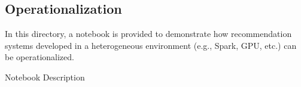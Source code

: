\subsection{Operationalization}

In this directory, a notebook is provided to demonstrate how recommendation systems developed in a heterogeneous environment (e.g., Spark, GPU, etc.) can be operationalized.

Notebook	Description
